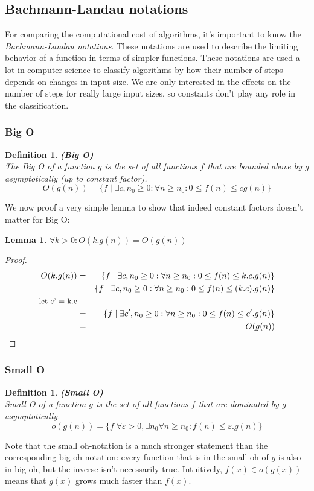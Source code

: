 \documentclass[a4paper,11pt]{report}
\newtheorem{lemma}[theorem]{Lemma}
\newtheorem{definition}[theorem]{Definition}
\begin{document}
\subsection{Bachmann-Landau notations}
For comparing the computational cost of algorithms, 
it's important to know the \emph{Bachmann-Landau notations}. These notations are used to describe the limiting behavior of a function in terms of simpler functions. 
These notations are used a lot in computer science to classify algorithms by how their number of steps depends on changes in input size. 
We are only interested in the effects on the number of steps for really large input sizes, so constants don't play any role in the classification.

\subsubsection{Big O}\begin{definition}\textbf{(Big O)}\\
The Big O of a function $g$ is the set of all functions $f$ that are bounded above by $g$ asymptotically (up to constant factor).
$$O(g(n)) = \{f\mid\exists c, n_0 \geq 0: \forall n \geq n_0 : 0 \leq f(n) \leq cg(n)\}$$
\end{definition}
We now proof a very simple lemma to show that indeed constant factors doesn't matter for Big O:
\begin{lemma}\label{constanten}
$\forall k > 0: O(k.g(n)) = O(g(n))$
\end{lemma}

\begin{proof}
\begin{eqnarray*}
O(k.g(n)) &=& \{f\mid\exists c, n_0 \geq 0: \forall n \geq n_0 : 0 \leq f(n) \leq k.c.g(n)\}\\
&=& \{f\mid\exists c, n_0 \geq 0: \forall n \geq n_0 : 0 \leq f(n) \leq (k.c).g(n)\}\\
\text{\small{let c' = k.c}}\\
&=& \{f\mid\exists c', n_0 \geq 0: \forall n \geq n_0 : 0 \leq f(n) \leq c'.g(n)\}\\
&=& O(g(n))
\end{eqnarray*}
\end{proof}



\subsubsection{Small O}
\begin{definition}\textbf{(Small O)}\\
Small O of a function $g$ is the set of all functions $f$ that are dominated by $g$ asymptotically.
$$o(g(n)) = \{f|\forall \varepsilon > 0, \exists n_0 \forall n \geq n_0: f(n) \leq \varepsilon.g(n)\}$$
\end{definition}
Note that the small oh-notation is a much stronger statement than the corresponding big oh-notation: every function that is in the small oh of $g$ is also in big oh, but the inverse isn't necessarily true. Intuitively, $f(x) \in o(g(x))$ means that $g(x)$ grows much faster than $f(x)$.
\end{document}
